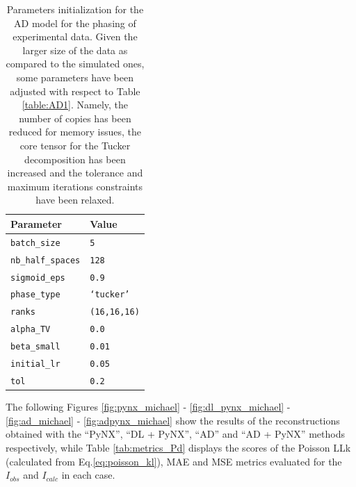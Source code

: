 \begin{table}[H] 

  \centering
  {%
    \begin{tabular}{|l|l|}
      \hline
      \textbf{Parameter} & \textbf{Value} \\
      \hline 
      \texttt{batch\_size}                      & \texttt{5} \\
      \texttt{nb\_half\_spaces}                 & \texttt{128} \\
      \texttt{sigmoid\_eps}                     & \texttt{0.9} \\
      \texttt{phase\_type}                      & \texttt{`tucker'} \\
      \texttt{ranks}                            & \texttt{(16,16,16)} \\
      \texttt{alpha\_TV}                        & \texttt{0.0} \\
      \texttt{beta\_small}                      & \texttt{0.01} \\
      \texttt{initial\_lr}                      & \texttt{0.05} \\
      \texttt{tol}                              & \texttt{0.2} \\
      \hline
    \end{tabular}%
  } 
  \caption{Parameters initialization for the AD model for the phasing of experimental data. Given the larger size of the 
  data as compared to the simulated ones, some parameters have been adjusted with respect to 
  Table \ref{table:AD1}. Namely, the number of copies has been reduced for memory issues, the core tensor for the 
  Tucker decomposition has been increased and the tolerance and maximum iterations constraints have been relaxed. }
  \label{table:AD}
\end{table}


The following Figures \ref{fig:pynx_michael} - \ref{fig:dl_pynx_michael} - \ref{fig:ad_michael} - \ref{fig:adpynx_michael} show the results 
of the reconstructions obtained with the ``PyNX'', ``DL + PyNX'', ``AD'' and ``AD + PyNX'' methods respectively, while Table \ref{tab:metrics_Pd} 
displays the scores of the Poisson LLk (calculated from Eq.\ref{eq:poisson_kl}), MAE and MSE metrics evaluated for the 
$I_{obs}$ and $I_{calc}$ in each case.



